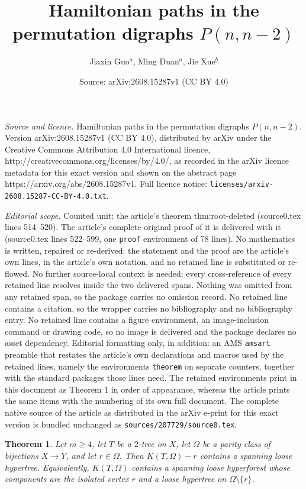 \documentclass[10pt,a4paper]{amsart}
\title{Hamiltonian paths in the permutation digraphs $P(n,n-2)$}
\author{Jiaxin Guo$^{a}$, Ming Duan$^{a}$, Jie Xue$^{b}$}
\date{Source: arXiv:2608.15287v1 (CC BY 4.0)}
\newtheorem{theorem}{Theorem}
\begin{document}
\maketitle

\noindent\emph{Source and licence.} Hamiltonian paths in the permutation digraphs $P(n,n-2)$. Version arXiv:2608.15287v1 (CC BY 4.0), distributed by arXiv under the Creative Commons Attribution 4.0 International licence, http://creativecommons.org/licenses/by/4.0/, as recorded in the arXiv licence metadata for this exact version and shown on the abstract page https://arxiv.org/abs/2608.15287v1. Full licence notice: \texttt{licenses/arxiv-2608.15287-CC-BY-4.0.txt}.\par\smallskip

\noindent\textit{Editorial scope.} Counted unit: the article's theorem thm:root-deleted (source0.tex lines 514--520). The article's complete original proof of it is delivered with it (source0.tex lines 522--599, one \texttt{proof} environment of 78 lines). No mathematics is written, repaired or re-derived: the statement and the proof are the article's own lines, in the article's own notation, and no retained line is substituted or re-flowed.  No further source-local context is needed: every cross-reference of every retained line resolves inside the two delivered spans.  Nothing was omitted from any retained span, so the package carries no omission record.  No retained line contains a citation, so the wrapper carries no bibliography and no bibliography entry.  No retained line contains a figure environment, an image-inclusion command or drawing code, so no image is delivered and the package declares no asset dependency.  Editorial formatting only, in addition: an AMS \texttt{amsart} preamble that restates the article's own declarations and macros used by the retained lines, namely the environments \texttt{theorem} on separate counters, together with the standard packages those lines need.  The retained environments print in this document as Theorem 1 in order of appearance, whereas the article prints the same items with the numbering of its own full document.  The complete native source of the article as distributed in the arXiv e-print for this exact version is bundled unchanged as \texttt{sources/207729/source0.tex}.
\begin{theorem}\label{thm:root-deleted}
Let $m\geq4$, let $T$ be a $2$-tree on $X$, let $\Omega$ be a parity class
of bijections $X\to Y$, and let $r\in\Omega$. Then $K(T,\Omega)-r$ contains
a spanning loose hypertree. Equivalently, $K(T,\Omega)$ contains a spanning
loose hyperforest whose components are the isolated vertex $r$ and a loose
hypertree on $\Omega\setminus\{r\}$.
\end{theorem}
\end{document}

